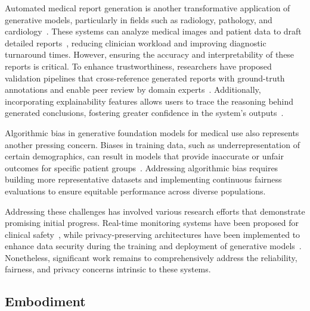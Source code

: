Automated medical report generation is another transformative application of generative models, particularly in fields such as radiology, pathology, and cardiology~\cite{liu2023tailoring, li2024artificial}. These systems can analyze medical images and patient data to draft detailed reports~\cite{wu2023exploring}, reducing clinician workload and improving diagnostic turnaround times. However, ensuring the accuracy and interpretability of these reports is critical. To enhance trustworthiness, researchers have proposed validation pipelines that cross-reference generated reports with ground-truth annotations and enable peer review by domain experts~\cite{liu2023artificial}. Additionally, incorporating explainability features allows users to trace the reasoning behind generated conclusions, fostering greater confidence in the system's outputs~\cite{liu2023evaluating}.

Algorithmic bias in generative foundation models for medical use also represents another pressing concern. Biases in training data, such as underrepresentation of certain demographics, can result in models that provide inaccurate or unfair outcomes for specific patient groups~\cite{schaich2016own, larrazabal2020gender}. Addressing algorithmic bias requires building more representative datasets and implementing continuous fairness evaluations to ensure equitable performance across diverse populations.

Addressing these challenges has involved various research efforts that demonstrate promising initial progress. Real-time monitoring systems have been proposed for clinical safety~\cite{liu2023artificial}, while privacy-preserving architectures have been implemented to enhance data security during the training and deployment of generative models~\cite{alberts2023large}. Nonetheless, significant work remains to comprehensively address the reliability, fairness, and privacy concerns intrinsic to these systems.



\subsection{Embodiment}


